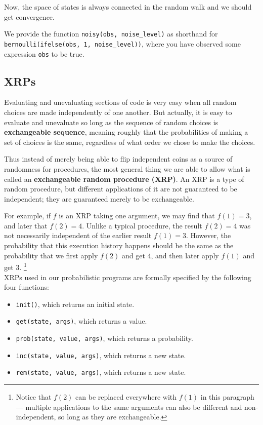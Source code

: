 \documentclass[11pt]{article}
\begin{document}
Now, the space of states is always connected in the random walk and we should get convergence.\vspace{6 pt}%

We provide the function {\tt noisy(obs, noise\_level)} as shorthand for {\tt bernoulli(ifelse(obs, 1, noise\_level))}, where you have observed some expression {\tt obs} to be true.  



\subsection{XRPs}

Evaluating and unevaluating sections of code is very easy when all random choices are made independently of one another.  But actually, it is easy to evaluate and unevaluate so long as the sequence of random choices is {\bf exchangeable sequence}, meaning roughly that the probabilities of making a set of choices is the same, regardless of what order we chose to make the choices.  

Thus instead of merely being able to flip independent coins as a source of randomness for procedures, the most general thing we are able to allow what is called an {\bf exchangeable random procedure (XRP)}.  An XRP is a type of random procedure, but different applications of it are not guaranteed to be independent; they are guaranteed merely to be exchangeable.  

For example, if $f$ is an XRP taking one argument, we may find that $f(1) = 3$, and later that $f(2) = 4$.  Unlike a typical procedure, the result $f(2) = 4$ was not necessarily independent of the earlier result $f(1) = 3$.  However, the probability that this execution history happens should be the same as the probability that we first apply $f(2)$ and get $4$, and then later apply $f(1)$ and get $3$.  \footnote{Notice that $f(2)$ can be replaced everywhere with $f(1)$ in this paragraph --- multiple applications to the same arguments can also be different and non-independent, so long as they are exchangeable.}  \\

XRPs used in our probabilistic programs are formally specified by the following four functions:

\begin{itemize}
\item {\tt init()}, which returns an initial state.  
\item {\tt get(state, args)}, which returns a value.
\item {\tt prob(state, value, args)}, which returns a probability.
\item {\tt inc(state, value, args)}, which returns a new state.
\item {\tt rem(state, value, args)}, which returns a new state.
\end{itemize}
\end{document}
